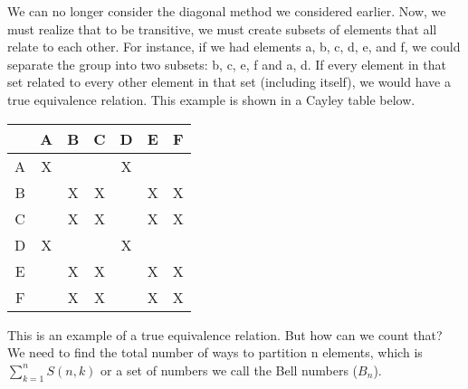 We can no longer consider the diagonal method we considered earlier. Now, we must realize that to be transitive, we must create subsets of elements that all relate to each other. For instance, if we had elements a, b, c, d, e, and f, we could separate the group into two subsets: {b, c, e, f} and {a, d}. If every element in that set related to every other element in that set (including itself), we would have a true equivalence relation. This example is shown in a Cayley table below.
\begin{center}
\begin{tabular} {c|c c c c c c}
& A & B & C & D & E & F \\
\hline
A & X &  &  & X & & \\
B &  & X & X &  & X & X \\
C &  & X & X & & X & X \\
D & X &  &  & X & &\\
E &  & X & X &  & X & X\\
F &  & X & X &  & X & X\\
\end{tabular}
\end{center}
This is an example of a true equivalence relation. But how can we count that? We need to find the total number of ways to partition n elements, which is \(\sum^{n}_{k=1}S(n,k)\) or a set of numbers we call the Bell numbers (\(B_{n}\)).
% 
